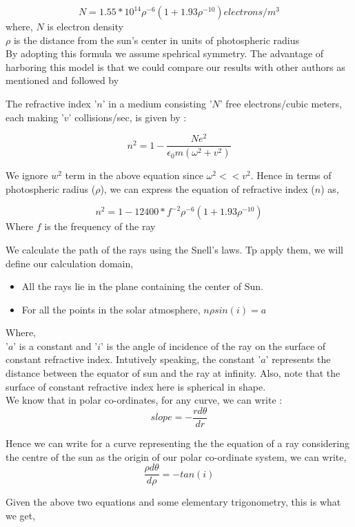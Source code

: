 \documentclass[journal]{IEEEtran}
\begin{document}
$$ N = 1.55*10^{14} \rho^{-6}(1 + 1.93\rho^{-10}) electrons/m^3 $$
where, 
$N$ is electron density \\ 
$\rho$ is the distance from the sun's center in units of photospheric radius \\

By adopting this formula we assume spehrical symmetry. The advantage of harboring this model is that we could compare our results with other authors as mentioned and followed by 
 

The refractive index '$n$' in a medium consisting '$N$' free electrons/cubic meters, each
making '$v$' collisions/sec, is given by :

$$ n^2 = 1 - \frac{Ne^2}{\epsilon_0m(\omega^2 + v^2)} $$

We ignore $w^2$ term in the above equation since $\omega^2 << v^2$. Hence in terms of photospheric radius ($\rho$), we can express the equation of refractive index ($n$) as,

$$ n^2 = 1 - 12400*f^{-2}\rho^{-6}(1 + 1.93\rho^{-10}) $$
Where $f$ is the frequency of the ray

We calculate the path of the rays using the Snell's laws. Tp apply them, we will define our calculation domain, \\ 
\begin{itemize}
\item All the rays lie in the plane containing the center of Sun.
\item For all the points in the solar atmosphere, $n\rho sin(i) = a $
\end{itemize}

Where, \\ 
'$a$' is a constant and '$i$' is the angle of incidence of the ray on the surface of constant refractive index. 
Intutively speaking, the constant '$a$' represents the distance between the equator of sun
and the ray at infinity. Also, note that the surface of constant refractive index here is spherical in shape. \\

We know that in polar co-ordinates, for any curve, we can write : 
$$ slope = -\frac{rd\theta}{dr} $$

Hence we can write for a curve representing the the equation of a ray considering the centre of the sun as the origin of our polar co-ordinate system, we can write, 
 $$ \frac{\rho d\theta}{d\rho} = -tan(i) $$  


Given the above two equations and some elementary trigonometry, this is what we get, 
\end{document}
